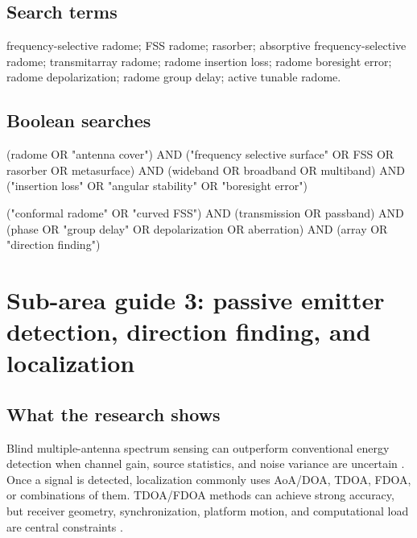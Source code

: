 \documentclass[
  10pt,
]{article}
\newenvironment{Shaded}{}{}
\newcommand{\NormalTok}[1]{#1}
\begin{document}
\subsection{Search terms}\label{search-terms-1}

frequency-selective radome; FSS radome; rasorber; absorptive
frequency-selective radome; transmitarray radome; radome insertion loss;
radome boresight error; radome depolarization; radome group delay;
active tunable radome.

\subsection{Boolean searches}\label{boolean-searches-1}

\begin{Shaded}
\begin{Highlighting}[]
\NormalTok{(radome OR "antenna cover")}
\NormalTok{AND ("frequency selective surface" OR FSS OR rasorber OR metasurface)}
\NormalTok{AND (wideband OR broadband OR multiband)}
\NormalTok{AND ("insertion loss" OR "angular stability" OR "boresight error")}
\end{Highlighting}
\end{Shaded}

\begin{Shaded}
\begin{Highlighting}[]
\NormalTok{("conformal radome" OR "curved FSS")}
\NormalTok{AND (transmission OR passband)}
\NormalTok{AND (phase OR "group delay" OR depolarization OR aberration)}
\NormalTok{AND (array OR "direction finding")}
\end{Highlighting}
\end{Shaded}

\section{Sub-area guide 3: passive emitter detection, direction finding,
and
localization}\label{sub-area-guide-3-passive-emitter-detection-direction-finding-and-localization}

\subsection{What the research shows}\label{what-the-research-shows-2}

Blind multiple-antenna spectrum sensing can outperform conventional
energy detection when channel gain, source statistics, and noise
variance are uncertain \citep{taherpour2010}. Once a signal is detected,
localization commonly uses AoA/DOA, TDOA, FDOA, or combinations of them.
TDOA/FDOA methods can achieve strong accuracy, but receiver geometry,
synchronization, platform motion, and computational load are central
constraints \citep{liu2019, pine2021}.
\end{document}
